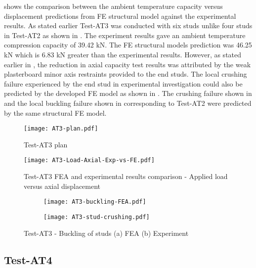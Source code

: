  shows the comparison between the ambient temperature capacity versus displacement predictions from FE structural model against the experimental results. As stated earlier Test-AT3 was conducted with six studs unlike four studs in Test-AT2 as shown in . The experiment results gave an ambient temperature compression capacity of 39.42 kN. The FE structural models prediction was 46.25 kN which is 6.83 kN greater than the experimental results. However, as stated earlier in ,  the reduction in axial capacity test results was attributed by the weak plasterboard minor axis restraints provided to the end studs. The local crushing failure experienced by the end stud in experimental investigation could also be predicted by the developed FE model as shown in . The crushing failure shown in  and the local buckling failure shown in  corresponding to Test-AT2 were predicted by the same structural FE model. 
\begin{figure}[!htbp]
	\centering
			\texttt{[image: AT3-plan.pdf]}\\
		\caption{Test-AT3 plan}
		\label{fig:AT3-plan-fea}
\end{figure}
\begin{figure}[!htbp]
	\centering
			\texttt{[image: AT3-Load-Axial-Exp-vs-FE.pdf]}\\
		\caption{Test-AT3 FEA and experimental results comparison - Applied load versus axial displacement}
		\label{fig:AT3-fea}
\end{figure}
\begin{figure}[!htbp]
	\centering
	\begin{subfigure}[b]{0.45\textwidth}
		\centering
		\texttt{[image: AT3-buckling-FEA.pdf]}
		\caption{}
		\label{subfig:AT3-buckling-FEA}
	\end{subfigure}
	\begin{subfigure}[b]{0.45\textwidth}
		\centering
		\texttt{[image: AT3-stud-crushing.pdf]}
		\caption{}
		\label{subfig:AT3-buckling-experiment}
	\end{subfigure}
	   \caption{Test-AT3 - Buckling of studs (a) FEA (b) Experiment}
	   \label{fig:AT3-buckling-fea-comparison}
\end{figure} 

\subsection*{Test-AT4}

